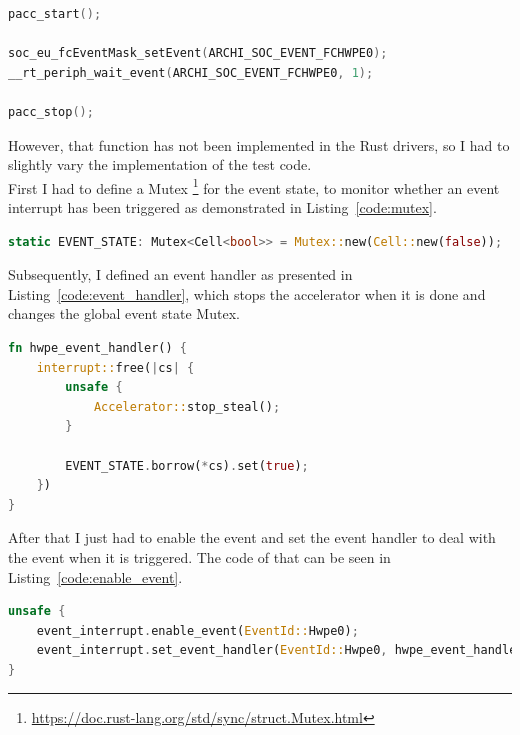 \begin{minipage}{\textwidth}
\begin{lstlisting}[style=colorEX,language=C,caption={Waiting for the event in C},label={code:c_wait_for_event}]
pacc_start();

soc_eu_fcEventMask_setEvent(ARCHI_SOC_EVENT_FCHWPE0);
__rt_periph_wait_event(ARCHI_SOC_EVENT_FCHWPE0, 1);

pacc_stop();
\end{lstlisting}
\end{minipage}

However, that function has not been implemented in the Rust drivers, so I had to slightly
vary the implementation of the test code.\\
First I had to define a Mutex \footnote{\url{https://doc.rust-lang.org/std/sync/struct.Mutex.html}}
for the event state, to monitor whether an event interrupt has been triggered as demonstrated
in Listing~\ref{code:mutex}.

\begin{lstlisting}[style=colorEX,language=Rust,caption={Definition of the necessary Mutexes},label={code:mutex}]
static EVENT_STATE: Mutex<Cell<bool>> = Mutex::new(Cell::new(false));
\end{lstlisting}

Subsequently, I defined an event handler as presented in Listing~\ref{code:event_handler}, which
stops the accelerator when it is done and changes the global event state Mutex.

\begin{minipage}{\textwidth}
\begin{lstlisting}[style=colorEX,language=Rust,caption={Event handler function},label={code:event_handler}]
fn hwpe_event_handler() {
    interrupt::free(|cs| {
        unsafe {
            Accelerator::stop_steal();
        }

        EVENT_STATE.borrow(*cs).set(true);
    })
}
\end{lstlisting}
\end{minipage}

After that I just had to enable the event and set the event handler to deal with the event when it is triggered.
The code of that can be seen in Listing~\ref{code:enable_event}.

\begin{minipage}{\textwidth}
\begin{lstlisting}[style=colorEX,language=Rust,caption={Code to enable the hardware event and set the handler},label={code:enable_event}]
unsafe {
    event_interrupt.enable_event(EventId::Hwpe0);
    event_interrupt.set_event_handler(EventId::Hwpe0, hwpe_event_handler);
}
\end{lstlisting}
\end{minipage}

